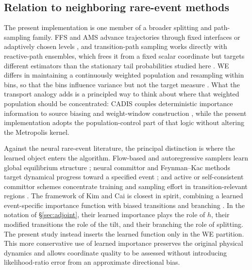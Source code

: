 \documentclass[a4paper,fleqn]{cas-sc}
\begin{document}
\subsection{Relation to neighboring rare-event methods}\label{sec:relation}
The present implementation is one member of a broader splitting and path-sampling family.
FFS and AMS advance trajectories through fixed interfaces or adaptively chosen levels
\citep{allen2009,valeriani2007,cerou2007}, and transition-path sampling works directly with
reactive-path ensembles, which frees it from a fixed scalar coordinate but targets different
estimators than the stationary tail probabilities studied here
\citep{chandler1978,dellago1998,bolhuis2002}. WE differs in maintaining a continuously weighted
population and resampling within bins, so that the bins influence variance but not the target
measure \citep{huber1996,zhang2010,zuckerman2017}. What the transport analogy adds is a
principled way to think about where that weighted population should be concentrated: CADIS
couples deterministic importance information to source biasing and weight-window construction
\citep{wagner1998,haghighat2003,wagnerfw2014}, while the present implementation adopts the
population-control part of that logic without altering the Metropolis kernel.

Against the neural rare-event literature, the principal distinction is where the learned object
enters the algorithm. Flow-based and autoregressive samplers learn global equilibrium structure
\citep{wu2019,noe2019,nicoli2020,gabrie2022}; neural committor and Feynman--Kac methods target
dynamical progress toward a specified event \citep{khoo2019,li2022,strahan2023}; and active or
self-consistent committor schemes concentrate training and sampling effort in transition-relevant
regions \citep{rotskoff2022,kang2024,trizio2025}. The framework of Kim and Cai is closest in
spirit, combining a learned event-specific importance function with biased transitions and
branching \citep{kimcai2026}. In the notation of \S\ref{sec:adjoint}, their learned importance
plays the role of $h$, their modified transitions the role of the tilt, and their branching the
role of splitting. The present study instead inserts the learned function only in the WE
partition. This more conservative use of learned importance preserves the original physical
dynamics and allows coordinate quality to be assessed without introducing likelihood-ratio
error from an approximate directional bias.
\end{document}
